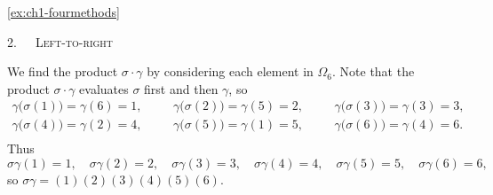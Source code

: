 \begin{solution}{\ref{ex:ch1-fourmethods}}
{    \textsc{2.~~~Left-to-right}

     We find the product \(\sigma\cdot\gamma\) by considering each element in \(\Omega_{6}\). Note that the product \(\sigma\cdot\gamma\) evaluates \(\sigma\) first and then \(\gamma\), so
    \[
    \begin{array}{ccc}
        \gamma\big(\sigma(1)\big) = \gamma(6) = 1, \hspace{20pt} & \gamma\big(\sigma(2)\big) = \gamma(5) = 2, \hspace{20pt} & \gamma\big(\sigma(3)\big) = \gamma(3) = 3, \\[8pt]
        \gamma\big(\sigma(4)\big) = \gamma(2) = 4, \hspace{20pt} & \gamma\big(\sigma(5)\big) = \gamma(1) = 5, \hspace{20pt} & \gamma\big(\sigma(6)\big) = \gamma(4) = 6. \\
    \end{array}
    \]
    Thus
    \[
    \sigma\gamma(1) = 1,\quad \sigma\gamma(2) = 2,\quad \sigma\gamma(3) = 3,\quad \sigma\gamma(4) = 4,\quad \sigma\gamma(5) = 5,\quad \sigma\gamma(6) = 6,
    \]
    so \(\sigma\gamma = (1)(2)(3)(4)(5)(6)\).

}
\end{solution}
